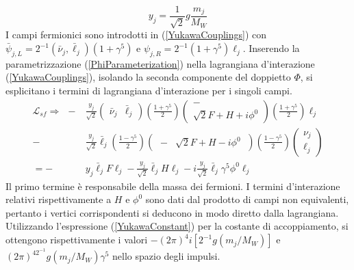 \documentclass[11pt]{article}
\begin{document}
    \begin{equation}\label{YukawaConstant}
    y_j=\frac{1}{\sqrt{2}}g\frac{m_j}{M_W}
    \end{equation}
    I campi fermionici sono introdotti in (\ref{YukawaCouplings}) con $\bar{\psi}_{j,L}=2^{-1}\left(\bar{\nu}_j,\bar{\ell}_j\right)(1+\gamma^5)$ e $\psi_{j,R}=2^{-1}(1+\gamma^5)\ell_{j}$.
    Inserendo la parametrizzazione (\ref{PhiParameterization}) nella lagrangiana d'interazione (\ref{YukawaCouplings}), isolando la seconda componente del doppietto $\Phi$,
    si esplicitano i termini di lagrangiana d'interazione per i singoli campi.
    \begin{equation}
    \begin{split}
    \mathcal{L}_{sf}\Longrightarrow\ \ -&\frac{y_j}{\sqrt{2}}\begin{pmatrix}\bar{\nu}_{j} & \bar{\ell}_{j}\end{pmatrix}\left(\frac{1+\gamma^5}{2}\right)\begin{pmatrix}-\\ \sqrt{2}F+H+i\phi^0\end{pmatrix}\left(\frac{1+\gamma^5}{2}\right)\ell_j\\
    -&\frac{y_j}{\sqrt{2}}\bar{\ell}_j\left(\frac{1-\gamma^5}{2}\right)\begin{pmatrix} \ - &\sqrt{2}F+H-i\phi^0\ \end{pmatrix}\left(\frac{1-\gamma^5}{2}\right)\begin{pmatrix} \nu_j\\ \ell_j \end{pmatrix}\\
    =-&y_j\bar{\ell}_jF\ell_j-\frac{y_j}{\sqrt{2}}\bar{\ell}_j H \ell_j-i\frac{y_j}{\sqrt{2}}\bar{\ell}_j \gamma^5\phi^0 \ell_j
    \end{split}
    \end{equation}
    Il primo termine è responsabile della massa dei fermioni. I termini d'interazione relativi rispettivamente a $H$ e $\phi^0$ sono dati dal prodotto di campi non equivalenti, pertanto i vertici corrispondenti si deducono in modo diretto dalla lagrangiana.
    Utilizzando l'espressione (\ref{YukawaConstant}) per la costante di accoppiamento, si ottengono rispettivamente i valori $-(2\pi)^4i[2^{-1}g(m_j/M_W)]$ e $(2\pi)^42^{-1}g(m_j/M_W)\gamma^5$ nello spazio degli impulsi.
\end{document}
